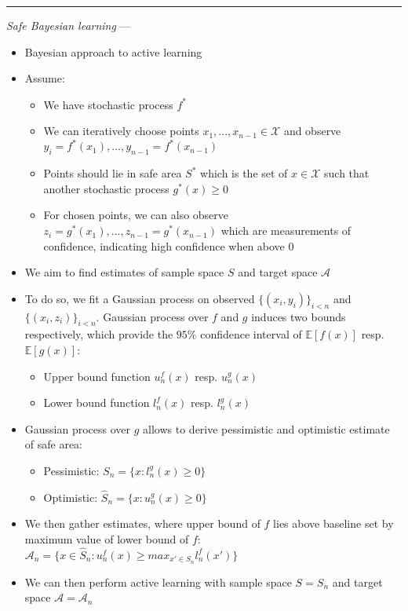 {\color{lightgray}\hrule height 0.001mm}

\emph{Safe Bayesian learning} ---
\begin{itemize}
    \item Bayesian approach to active learning
    \item Assume:
    \begin{itemize}
        \item We have stochastic process $f^*$
        \item We can iteratively choose points $x_1, ..., x_{n-1} \in \mathcal{X}$ and observe $y_i = f^*(x_1), ..., y_{n-1} = f^*(x_{n-1})$
        \item Points should lie in safe area $S^*$ which is the set of $x \in \mathcal{X}$ such that another stochastic process $g^*(x) \geq 0$
        \item For chosen points, we can also observe $z_i = g^*(x_1), ..., z_{n-1} = g^*(x_{n-1})$ which are measurements of confidence, indicating high confidence when above 0
    \end{itemize}
    \item We aim to find estimates of sample space $S$ and target space $\mathcal{A}$
    \item To do so, we fit a Gaussian process on observed $\{(x_i,y_i)\}_{i<n}$ and $\{(x_i,z_i)\}_{i<n}$. Gaussian process over $f$ and $g$ induces two bounds respectively, which provide the $95\%$ confidence interval of $\mathbb{E}[f(x)]$ resp. $\mathbb{E}[g(x)]$:
    \begin{itemize}
        \item Upper bound function $u_n^f(x)$ resp. $u_n^g(x)$
        \item Lower bound function $l_n^f(x)$ resp. $l_n^g(x)$
    \end{itemize}
    \item Gaussian process over $g$ allows to derive pessimistic and optimistic estimate of safe area:
    \begin{itemize}
        \item Pessimistic: $S_n = \{x: l_n^g(x) \geq 0\}$
        \item Optimistic: $\hat{S}_n = \{x: u_n^g(x) \geq 0\}$
    \end{itemize}
    \item We then gather estimates, where upper bound of $f$ lies above baseline set by maximum value of lower bound of $f$: $\mathcal{A}_n = \{x \in \hat{S}_n : u_n^f(x) \geq max_{x' \in S_n} l_n^f(x')\}$
    \item We can then perform active learning with sample space $S = S_n$ and target space $\mathcal{A} = \mathcal{A}_n$
\end{itemize}

